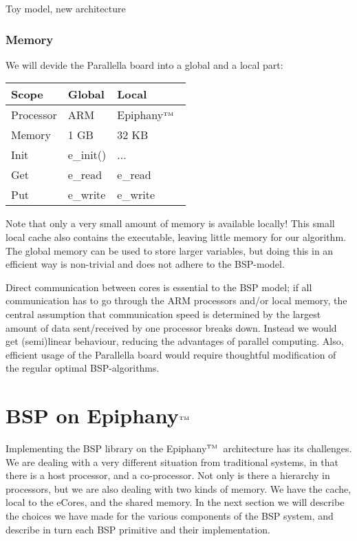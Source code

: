 \documentclass[fleqn]{article}
\renewcommand{\(}{\left(}
\renewcommand{\)}{\right)}
\def\tm{$^{\hbox{\tiny TM}}$~}
\begin{document}
Toy model, new architecture

\subsubsection{Memory}

We will devide the Parallella board into a global and a local part:

\begin{tabular}{l|ll}
Scope & Global & Local \\
\hline
Processor & ARM & Epiphany\tm \\
Memory & 1 GB & 32 KB \\
Init & e\_init() & ... \\
Get & e_read & e_read \\
Put & e_write & e_write \\

\end{tabular}

Note that only a very small amount of memory is available locally! This small local cache also contains the executable, leaving little memory for our algorithm. The global memory can be used to store larger variables, but doing this in an efficient way is non-trivial and does not adhere to the BSP-model. 

Direct communication between cores is essential to the BSP model; if all communication has to go through the ARM processors and/or local memory, the central assumption that communication speed is determined by the largest amount of data sent/received by one processor breaks down. Instead we would get (semi)linear behaviour, reducing the advantages of parallel computing. Also, efficient usage of the Parallella board would require thoughtful modification of the regular optimal BSP-algorithms. 

\section{BSP on Epiphany\tm}

Implementing the BSP library on the Epiphany\tm architecture has its challenges. We are dealing with a very different situation from traditional systems, in that there is a host processor, and a co-processor. Not only is there a hierarchy in processors, but we are also dealing with two kinds of memory. We have the cache, local to the eCores, and the shared memory. In the next section we will describe the choices we have made for the various components of the BSP system, and describe in turn each BSP primitive and their implementation.
\end{document}
